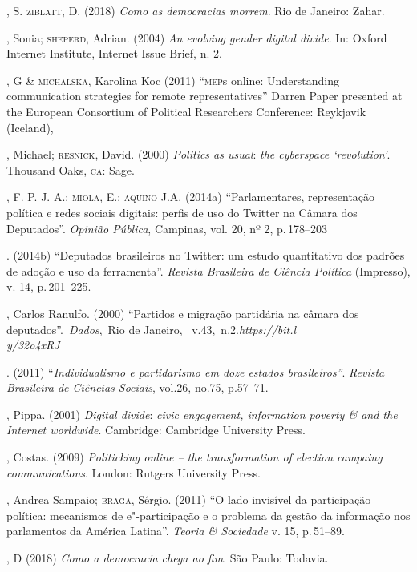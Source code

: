 \begin{bibliohedra}
, S. \textsc{ziblatt}, D. (2018) \emph{Como as democracias morrem}. Rio
de Janeiro: Zahar.

, Sonia; \textsc{sheperd}, Adrian. (2004) \emph{An evolving gender digital
divide}. In: Oxford Internet Institute, Internet Issue Brief, n. 2.

, G \& \textsc{michalska}, Karolina Koc (2011) ``\textsc{mep}s online:
Understanding communication strategies for remote representatives''
Darren Paper presented at the European Consortium of Political
Researchers Conference: Reykjavik (Iceland),

, Michael; \textsc{resnick}, David. (2000) \emph{Politics as usual}:
\emph{the cyberspace `revolution'}. Thousand Oaks, \textsc{ca}: Sage.

, F. P. J. A.; \textsc{miola}, E.; \textsc{aquino} J.A. (2014a) ``Parlamentares,
representação política e redes sociais digitais: perfis de uso do
Twitter na Câmara dos Deputados''. \emph{Opinião Pública}, Campinas,
vol. 20, nº 2, p.\,178--203

\titidem. (2014b) ``Deputados
brasileiros no Twitter: um estudo quantitativo dos padrões de adoção e
uso da ferramenta''. \emph{Revista Brasileira de Ciência Política}
(Impresso), v. 14, p.\,201--225.

, Carlos Ranulfo. (2000) ``Partidos e migração partidária na câmara
dos deputados''.~\emph{Dados},~Rio de Janeiro,~
v.43,~n.2.\emph{https://bit.l\\y/32o4xRJ}

\titidem. (2011) ``\emph{Individualismo e partidarismo em
doze estados brasileiros''}. \emph{Revista Brasileira de Ciências
Sociais}, vol.26, no.75, p.57--71.

, Pippa. (2001) \emph{Digital divide}: \emph{civic engagement,
information poverty \& and the Internet worldwide}. Cambridge: Cambridge
University Press.

, Costas. (2009) \emph{Politicking online -- the
transformation of election campaing communications}. London: Rutgers
University Press.

, Andrea Sampaio; \textsc{braga}, Sérgio. (2011) ``O lado invisível da
participação política: mecanismos de e"-participação e o problema da
gestão da informação nos parlamentos da América Latina''. \emph{Teoria
\& Sociedade} v. 15, p.\,51--89.

, D (2018) \emph{Como a democracia chega ao fim}. São Paulo:
Todavia.


\end{bibliohedra}
